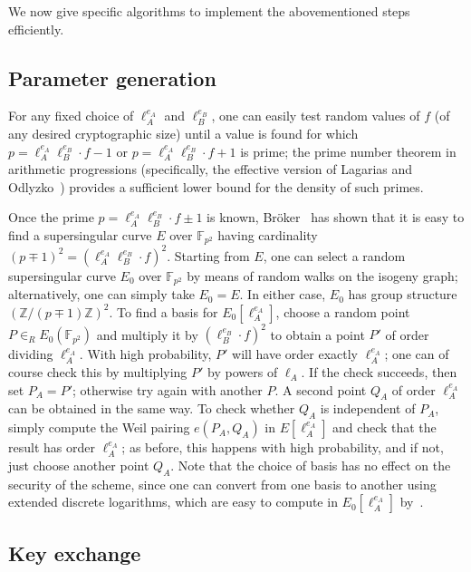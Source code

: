 \documentclass[envcountsect,envcountsame,runningheads]{llncs}   %
\newcommand{\ZZ}{{\mathbb{Z}}}
\newcommand{\FF}{{\mathbb{F}}}
\begin{document}
We now give specific algorithms to implement the abovementioned steps
efficiently. 

\subsection{Parameter generation}\label{subsec:parameter}

For any fixed choice of $\ell_A^{e_A}$ and $\ell_B^{e_B}$, one can
easily test random values of $f$ (of any desired cryptographic size)
until a value is found for which $p=\ell_A^{e_A} \ell_B^{e_B}\cdot f -
1$ or $p=\ell_A^{e_A} \ell_B^{e_B}\cdot f + 1$ is prime; the prime
number theorem in arithmetic progressions (specifically, the effective
version of Lagarias and Odlyzko~\cite{lo}) provides a sufficient lower
bound for the density of such primes. 

Once the prime $p= \ell_A^{e_A} \ell_B^{e_B}\cdot f \pm 1$ is known,
Br\"oker~\cite{broker-ss} has shown that it is easy to find a
supersingular curve $E$ over $\FF_{p^2}$ having cardinality $(p\mp
1)^2 = (\ell_A^{e_A} \ell_B^{e_B}\cdot f)^2$. Starting from $E$, one
can select a random supersingular curve $E_0$ over $\FF_{p^2}$ by
means of random walks on the isogeny graph;
alternatively, one can simply take $E_0 = E$. In either case, $E_0$
has group structure $(\ZZ/(p\mp 1)\ZZ)^2$. To find a basis for
$E_0[\ell_A^{e_A}]$, choose a random point $P \in_R E_0(\FF_{p^2})$
and multiply it by $(\ell_B^{e_B}\cdot f)^2$ to obtain a point $P'$ of
order dividing $\ell_A^{e_A}$. With high probability, $P'$ will have
order exactly $\ell_A^{e_A}$; one can of course check this by
multiplying $P'$ by powers of $\ell_A$. If the check succeeds, then
set $P_A = P'$; otherwise try again with another $P$. A second point
$Q_A$ of order $\ell_A^{e_A}$ can be obtained in the same way.  To
check whether $Q_A$ is independent of $P_A$, simply compute the Weil
pairing $e(P_A,Q_A)$ in $E[\ell_A^{e_A}]$ and check that the result
has order $\ell_A^{e_A}$; as before, this happens with high
probability, and if not, just choose another point $Q_A$. Note that
the choice of basis has no effect on the security of the scheme, since
one can convert from one basis to another using extended discrete
logarithms, which are easy to compute in $E_0[\ell_A^{e_A}]$
by~\cite{teske-ph}.

\subsection{Key exchange}\label{subsec:kea}
\end{document}
